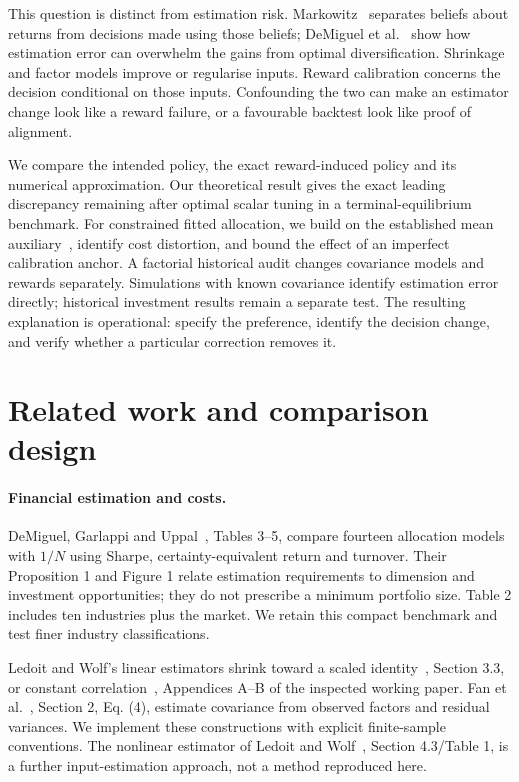 \documentclass[sigconf,anonymous,review]{acmart}
\begin{document}
This question is distinct from estimation risk. Markowitz~\cite{markowitz1952} separates beliefs about returns from decisions made using those beliefs; DeMiguel et al.~\cite{demiguel2009} show how estimation error can overwhelm the gains from optimal diversification. Shrinkage and factor models improve or regularise inputs. Reward calibration concerns the decision conditional on those inputs. Confounding the two can make an estimator change look like a reward failure, or a favourable backtest look like proof of alignment.

We compare the intended policy, the exact reward-induced policy and its numerical approximation. Our theoretical result gives the exact leading discrepancy remaining after optimal scalar tuning in a terminal-equilibrium benchmark. For constrained fitted allocation, we build on the established mean auxiliary~\cite{zhang2021}, identify cost distortion, and bound the effect of an imperfect calibration anchor. A factorial historical audit changes covariance models and rewards separately. Simulations with known covariance identify estimation error directly; historical investment results remain a separate test. The resulting explanation is operational: specify the preference, identify the decision change, and verify whether a particular correction removes it.

\section{Related work and comparison design}
\paragraph{Financial estimation and costs.}
DeMiguel, Garlappi and Uppal~\cite{demiguel2009}, Tables 3--5, compare fourteen allocation models with $1/N$ using Sharpe, certainty-equivalent return and turnover. Their Proposition 1 and Figure 1 relate estimation requirements to dimension and investment opportunities; they do not prescribe a minimum portfolio size. Table 2 includes ten industries plus the market. We retain this compact benchmark and test finer industry classifications.

Ledoit and Wolf's linear estimators shrink toward a scaled identity~\cite{ledoit2004identity}, Section 3.3, or constant correlation~\cite{ledoit2004correlation}, Appendices A--B of the inspected working paper. Fan et al.~\cite{fan2008}, Section 2, Eq. (4), estimate covariance from observed factors and residual variances. We implement these constructions with explicit finite-sample conventions. The nonlinear estimator of Ledoit and Wolf~\cite{ledoit2017}, Section 4.3/Table 1, is a further input-estimation approach, not a method reproduced here.
\end{document}
